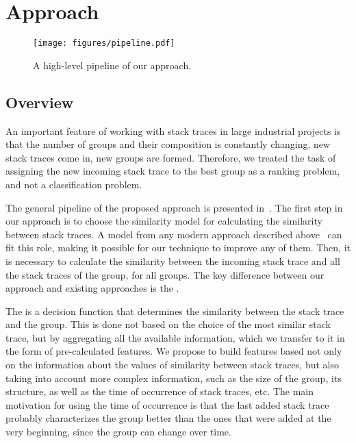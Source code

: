 \section{Approach}\label{sec:internals}

\begin{figure}[h!]
\centering
    \texttt{[image: figures/pipeline.pdf]}
    \centering
    \vspace{-0.4cm}
    \caption{A high-level pipeline of our approach.}
    \label{fig:scheme}
\end{figure}

\subsection{Overview}

An important feature of working with stack traces in large industrial projects is that the number of groups and their composition is constantly changing, new stack traces come in, new groups are formed. 
Therefore, we treated the task of assigning the new incoming stack trace to the best group as a ranking problem, and not a classification problem. 

The general pipeline of the proposed approach is presented in~.
The first step in our approach is to choose the similarity model for calculating the similarity between stack traces.
A model from any modern approach described above~\cite{modani,lerch,durfex,tracesim,s3m} can fit this role, making it possible for our technique to improve any of them.
Then, it is necessary to calculate the similarity between the incoming stack trace and all the stack traces of the group, for all groups.
The key difference between our approach and existing approaches is the \ag.

The \ag is a decision function that determines the similarity between the stack trace and the group.
This is done not based on the choice of the most similar stack trace, but by aggregating all the available information, which we transfer to it in the form of pre-calculated features.
We propose to build features based not only on the information about the values of similarity between stack traces, but also taking into account more complex information, such as the size of the group, its structure, as well as the time of occurrence of stack traces, etc.
The main motivation for using the time of occurrence is that the last added stack trace probably characterizes the group better than the ones that were added at the very beginning, since the group can change over time.

